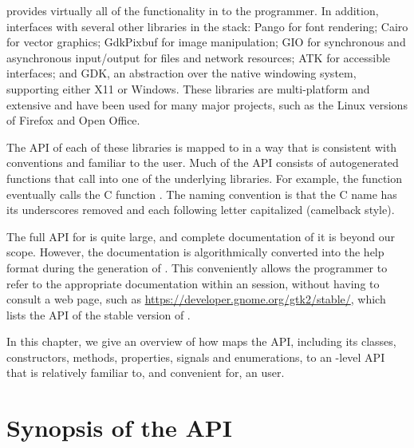  provides virtually all of the functionality in \GTK\/ to
the \R\/ programmer. In addition,  interfaces with several
other libraries in the \GTK\/ stack: Pango for font rendering; Cairo
for vector graphics; GdkPixbuf for image manipulation; GIO for
synchronous and asynchronous input/output for files and network
resources; ATK for accessible interfaces; and GDK, an abstraction over
the native windowing system, supporting either X11 or Windows. These
libraries are multi-platform and extensive and have been used for many
major projects, such as the Linux versions of Firefox and Open Office.

The API of each of these libraries is mapped to \R\/ in a way that is
consistent with \R\/ conventions and familiar to the \R\/
user. Much of the  API consists of autogenerated \R\/
functions that call into one of the underlying libraries. For
example, the \R\/ function  eventually calls
the C function . The naming convention is
that the C name has its underscores removed and each following letter
capitalized (camelback style).

The full API for \GTK\/ is quite large, and complete documentation of
it is beyond our scope. However, the \GTK\/ documentation is
algorithmically converted into the \R\/ help format during the
generation of . This conveniently allows the programmer to
refer to the appropriate documentation within an \R\/ session, without
having to consult a web page, such as
\url{https://developer.gnome.org/gtk2/stable/}, which lists the
 API of the stable version of \GTK.

In this chapter, we give an overview of how  maps the
\GTK\/ API, including its classes, constructors, methods, properties,
signals and enumerations, to an \R-level API that is relatively
familiar to, and convenient for, an \R\/ user. 


\section{Synopsis of the  API}

